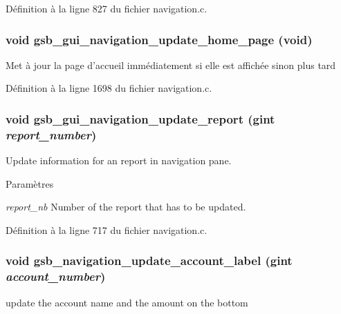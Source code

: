 Définition à la ligne 827 du fichier navigation.c.

\subsubsection[{gsb\_\-gui\_\-navigation\_\-update\_\-home\_\-page}]{\setlength{\rightskip}{0pt plus 5cm}void gsb\_\-gui\_\-navigation\_\-update\_\-home\_\-page (void)}\label{navigation_8c_a4deacb31bc63a27b2ed5b39f79bffc0b}
Met à jour la page d'accueil immédiatement si elle est affichée sinon plus tard 

Définition à la ligne 1698 du fichier navigation.c.

\subsubsection[{gsb\_\-gui\_\-navigation\_\-update\_\-report}]{\setlength{\rightskip}{0pt plus 5cm}void gsb\_\-gui\_\-navigation\_\-update\_\-report (gint {\em report\_\-number})}\label{navigation_8c_adbca6d230d0584e10054913fbce3caf1}
Update information for an report in navigation pane.


\begin{DoxyParams}{Paramètres}
\item[{\em report\_\-nb}]Number of the report that has to be updated. \end{DoxyParams}


Définition à la ligne 717 du fichier navigation.c.

\subsubsection[{gsb\_\-navigation\_\-update\_\-account\_\-label}]{\setlength{\rightskip}{0pt plus 5cm}void gsb\_\-navigation\_\-update\_\-account\_\-label (gint {\em account\_\-number})}\label{navigation_8c_a85b5920bb0556b488e09294e8cfbcb0e}
update the account name and the amount on the bottom


